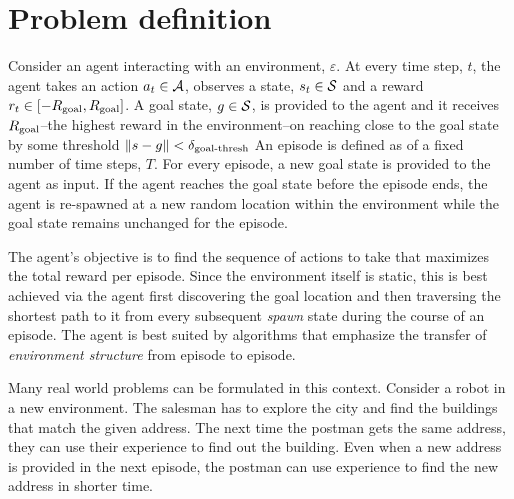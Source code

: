 \section{Problem definition}

Consider an agent interacting with an environment, $\varepsilon$. At
every time step, $t$, the agent takes an action $a_t \in \mathcal{A}$, observes a
state, $s_t \in \mathcal{S}$ and a reward $r_t \in [-R_{\text{goal}}, R_{\text{goal}}]$.
A goal state, $g \in \mathcal{S}$, is provided to the agent and it receives
$R_{\text{goal}}$--the highest reward in the environment--on reaching close to the goal
state by some threshold $\|s -g\| < \delta_{\text{goal-thresh}}$
An episode is defined as of a fixed number of time steps, $T$. For
every episode, a new goal state is provided to the agent as input. If the agent
reaches the goal state before the episode ends, the agent is 
re-spawned at a new random location within the environment while the goal state
remains unchanged for the episode.

The agent's objective is to find the sequence of actions to take that maximizes
the total reward per episode. Since the environment itself is static, this is
best achieved via the agent first discovering the goal location and then
traversing the shortest path to it from every subsequent \emph{spawn} state
during the course of an episode. The agent is best suited by algorithms that
emphasize the transfer of \emph{environment structure} from episode to episode.



%
%

Many real world problems can be formulated in this context. Consider a robot
in a new environment.
The salesman has to explore the city and find the buildings that match the given
address. The next time the postman gets the same address, they can use their
experience to find out the building. Even when a new address is provided in the
next episode, the postman can use experience to find the new address in shorter
time.

